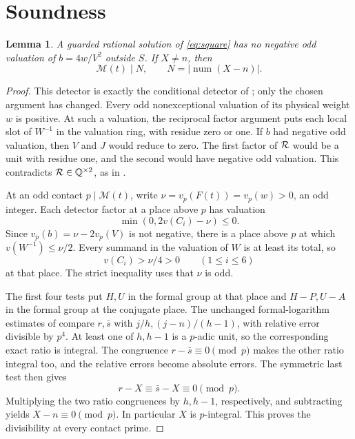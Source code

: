 \documentclass[11pt,a4paper]{article}
\newtheorem{lemma}[theorem]{Lemma}
\newcommand{\Q}{\mathbb Q}\newcommand{\Z}{\mathbb Z}
\begin{document}
\section{Soundness}

\begin{lemma}\label{lem:local}
A guarded rational solution of \eqref{eq:square} has no negative odd
valuation of \(b=4w/V^2\) outside \(S\).
If \(X\ne n\), then
\[
 \mathcal M(t)\mid N,\qquad
 N=|\operatorname{num}(X-n)|.
\]
\end{lemma}
\begin{proof}
This detector is exactly the conditional detector of
\cite{Reweighted}; only the chosen argument has changed.
Every odd nonexceptional valuation of its physical weight \(w\)
is positive. At such a valuation, the reciprocal factor argument
puts each local slot of \(W^{-1}\) in the valuation ring, with residue
zero or one. If \(b\) had negative odd valuation, then \(V\) and \(J\)
would reduce to zero. The first factor of \({\cal R}\) would be a unit
with residue one, and the second would have negative odd valuation.
This contradicts \({\cal R}\in\Q^{\times2}\), as in \cite{Native}.

At an odd contact \(p\mid\mathcal M(t)\), write
\(\nu=v_p(F(t))=v_p(w)>0\), an odd integer. Each detector factor at
a place above \(p\) has valuation
\[
 \min(0,2v(C_i)-\nu)\le0.
\]
Since \(v_p(b)=\nu-2v_p(V)\) is not negative, there is a place above
\(p\) at which \(v(W^{-1})\le\nu/2\). Every summand in the valuation
of \(W\) is at least its total, so
\[
 v(C_i)>\nu/4>0\qquad(1\le i\le6)
\]
at that place. The strict inequality uses that \(\nu\) is odd.

The first four tests put \(H,U\) in the formal group at that place
and \(H-P,U-A\) in the formal group at the conjugate place.
The unchanged formal-logarithm estimates of \cite{Conditional}
compare \(r,\bar s\) with \(j/h,(j-n)/(h-1)\), with relative
error divisible by \(p^4\). At least one of \(h,h-1\) is a
\(p\)-adic unit, so the corresponding exact ratio is integral.
The congruence \(r-\bar s\equiv0\pmod p\) makes the other ratio
integral too, and the relative errors become absolute errors.
The symmetric last test then gives
\[
 r-X\equiv\bar s-X\equiv0\pmod p.
\]
Multiplying the two ratio congruences by \(h,h-1\), respectively,
and subtracting yields \(X-n\equiv0\pmod p\).
In particular \(X\) is \(p\)-integral. This proves the divisibility
at every contact prime.
\end{proof}
\end{document}
